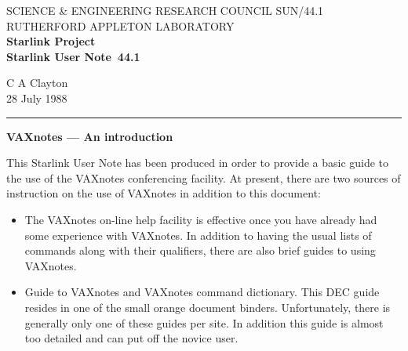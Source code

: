 \pagestyle{myheadings}

\newcommand{\stardoccategory}  {Starlink User Note}
\newcommand{\stardocinitials}  {SUN}
\newcommand{\stardocnumber}    {44.1}
\newcommand{\stardocauthors}   {C A Clayton}
\newcommand{\stardocdate}      {28 July 1988}
\newcommand{\stardoctitle}     {VAXnotes --- An introduction}

\newcommand{\stardocname}{\stardocinitials /\stardocnumber}
\markright{\stardocname}
\setlength{\textwidth}{160mm}
\setlength{\textheight}{240mm}
\setlength{\topmargin}{-5mm}
\setlength{\oddsidemargin}{0mm}
\setlength{\evensidemargin}{0mm}
\setlength{\parindent}{0mm}
\setlength{\parskip}{\medskipamount}
\setlength{\unitlength}{1mm}


\thispagestyle{empty}
SCIENCE \& ENGINEERING RESEARCH COUNCIL \hfill \stardocname\\
RUTHERFORD APPLETON LABORATORY\\
{\large\bf Starlink Project\\}
{\large\bf \stardoccategory\ \stardocnumber}
\begin{flushright}
\stardocauthors\\
\stardocdate
\end{flushright}
\vspace{-4mm}
\rule{\textwidth}{0.5mm}
\vspace{5mm}
\begin{center}
{\Large\bf \stardoctitle}
\end{center}
\vspace{5mm}

This Starlink User Note has been produced in order to provide a basic
guide to the use of the VAXnotes conferencing facility.
At present, there are two sources of instruction on the use of VAXnotes
in addition to this document:

\begin{itemize}

\item The VAXnotes on-line help facility is effective once you
have already had some experience with VAXnotes. In addition to having
the usual lists of commands along with their qualifiers, there are
also brief guides to using VAXnotes.

\item Guide to VAXnotes and VAXnotes command dictionary. This DEC
guide resides in one of the small orange document binders. Unfortunately,
there is generally only one of these guides per site. In
addition this guide is almost too detailed and can put off the novice user.


\end{itemize}

